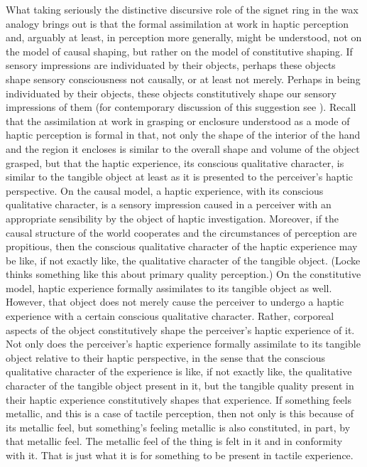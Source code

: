 What taking seriously the distinctive discursive role of the signet ring in the wax analogy brings out is that the formal assimilation at work in haptic perception and, arguably at least, in perception more generally, might be understood, not on the model of causal shaping, but rather on the model of constitutive shaping. If sensory impressions are individuated by their objects, perhaps these objects shape sensory consciousness not causally, or at least not merely. Perhaps in being individuated by their objects, these objects constitutively shape our sensory impressions of them (for contemporary discussion of this suggestion see \citealt{Kalderon:2008fk,Kalderon:2007mr,Kalderon:2011fk}). Recall that the assimilation at work in grasping or enclosure understood as a mode of haptic perception is formal in that, not only the shape of the interior of the hand and the region it encloses is similar to the overall shape and volume of the object grasped, but that the haptic experience, its conscious qualitative character, is similar to the tangible object at least as it is presented to the perceiver’s haptic perspective. On the causal model, a haptic experience, with its conscious qualitative character, is a sensory impression caused in a perceiver with an appropriate sensibility by the object of haptic investigation. Moreover, if the causal structure of the world cooperates and the circumstances of perception are propitious, then the conscious qualitative character of the haptic experience may be like, if not exactly like, the qualitative character of the tangible object. (Locke thinks something like this about primary quality perception.) On the constitutive model, haptic experience formally assimilates to its tangible object as well. However, that object does not merely cause the perceiver to undergo a haptic experience with a certain conscious qualitative character. Rather, corporeal aspects of the object constitutively shape the perceiver's haptic experience of it. Not only does the perceiver's haptic experience formally assimilate to its tangible object relative to their haptic perspective, in the sense that the conscious qualitative character of the experience is like, if not exactly like, the qualitative character of the tangible object present in it, but the tangible quality present in their haptic experience constitutively shapes that experience. If something feels metallic, and this is a case of tactile perception, then not only is this because of its metallic feel, but something's feeling metallic is also constituted, in part, by that metallic feel. The metallic feel of the thing is felt in it and in conformity with it. That is just what it is for something to be present in tactile experience.

